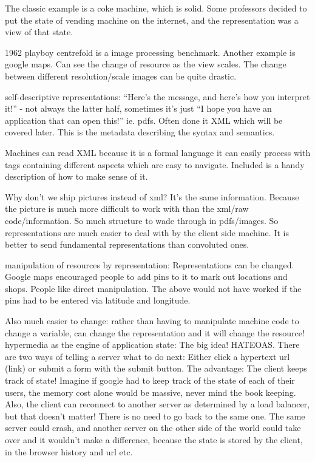 \documentclass[11pt]{article}
\begin{document}
The classic example is a coke machine, which is solid. Some professors decided to put the state of vending machine on the internet, and the representation was a view of that state.

1962 playboy centrefold is a image processing benchmark. Another example is google maps. Can see the change of resource as the view scales. The change between different resolution/scale images can be quite drastic.

self-descriptive representations: “Here’s the message, and here’s how you interpret it!” - not always the latter half, sometimes it’s just “I hope you have an application that can open this!” ie. pdfs. Often done it XML which will be covered later. This is the metadata describing the syntax and semantics. 

Machines can read XML because it is a formal language it can easily process with tags containing different aspects which are easy to navigate. Included is a handy description of how to make sense of it.

Why don’t we ship pictures instead of xml? It’s the same information. Because the picture is much more difficult to work with than the xml/raw code/information. So much structure to wade through in pdfs/images. So representations are much easier to deal with by the client side machine. It is better to send fundamental representations than convoluted ones.

manipulation of resources by representation: Representations can be changed. Google maps encouraged people to add pins to it to mark out locations and shops. People like direct manipulation. The above would not have worked if the pins had to be entered via latitude and longitude.

Also much easier to change: rather than having to manipulate machine code to change a variable, can change the representation and it will change the resource!
hypermedia as the engine of application state: The big idea! HATEOAS. There are two ways of telling a server what to do next: Either click a hypertext url (link) or submit a form with the submit button. The advantage: The client keeps track of state! Imagine if google had to keep track of the state of each of their users, the memory cost alone would be massive, never mind the book keeping. Also, the client can reconnect to another server as determined by a load balancer, but that doesn’t matter! There is no need to go back to the same one. The same server could crash, and another server on the other side of the world could take over and it wouldn’t make a difference, because the state is stored by the client, in the browser history and url etc.
\end{document}
